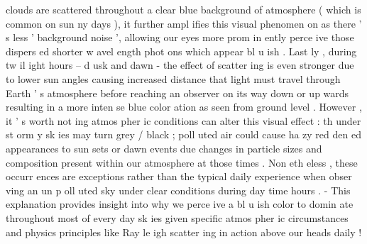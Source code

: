 \documentclass{article}%
\begin{document}
 clouds%
 are%
 scattered%
 throughout%
 a%
 clear%
 blue%
 background%
 of%
 atmosphere%
 (%
which%
 is%
 common%
 on%
 sun%
ny%
 days%
),%
 it%
 further%
 ampl%
ifies%
 this%
 visual%
 phenomen%
on%
 as%
 there%
'%
s%
 less%
 '%
background%
 noise%
',%
 allowing%
 our%
 eyes%
 more%
 prom%
in%
ently%
 perce%
ive%
 those%
 dispers%
ed%
 shorter%
 w%
avel%
ength%
 phot%
ons%
 which%
 appear%
 bl%
u%
ish%
.%
\newline%
%
\newline%
%
Last%
ly%
,%
 during%
 tw%
il%
ight%
 hours%
 –%
 d%
usk%
 and%
 dawn%
 {-}%
 the%
 effect%
 of%
 scatter%
ing%
 is%
 even%
 stronger%
 due%
 to%
 lower%
 sun%
 angles%
 causing%
 increased%
 distance%
 that%
 light%
 must%
 travel%
 through%
 Earth%
'%
s%
 atmosphere%
 before%
 reaching%
 an%
 observer%
 on%
 its%
 way%
 down%
 or%
 up%
wards%
 resulting%
 in%
 a%
 more%
 inten%
se%
 blue%
 color%
ation%
 as%
 seen%
 from%
 ground%
 level%
.%
\newline%
%
\newline%
%
However%
,%
 it%
’%
s%
 worth%
 not%
ing%
 atmos%
pher%
ic%
 conditions%
 can%
 alter%
 this%
 visual%
 effect%
:%
 th%
under%
st%
orm%
y%
 sk%
ies%
 may%
 turn%
 grey%
/%
black%
;%
 poll%
uted%
 air%
 could%
 cause%
 ha%
zy%
 red%
den%
ed%
 appearances%
 to%
 sun%
sets%
 or%
 dawn%
 events%
 due%
 changes%
 in%
 particle%
 sizes%
 and%
 composition%
 present%
 within%
 our%
 atmosphere%
 at%
 those%
 times%
.%
 Non%
eth%
eless%
,%
 these%
 occurr%
ences%
 are%
 exceptions%
 rather%
 than%
 the%
 typical%
 daily%
 experience%
 when%
 obser%
ving%
 an%
 un%
p%
oll%
uted%
 sky%
 under%
 clear%
 conditions%
 during%
 day%
time%
 hours%
.%
\newline%
%
{-}%
 This%
 explanation%
 provides%
 insight%
 into%
 why%
 we%
 perce%
ive%
 a%
 bl%
u%
ish%
 color%
 to%
 domin%
ate%
 throughout%
 most%
 of%
 every%
day%
 sk%
ies%
 given%
 specific%
 atmos%
pher%
ic%
 circumstances%
 and%
 physics%
 principles%
 like%
 Ray%
le%
igh%
 scatter%
ing%
 in%
 action%
 above%
 our%
 heads%
 daily%
!%

%
\end{document}
